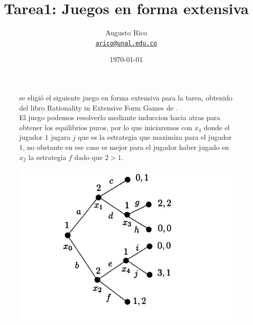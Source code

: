 \documentclass[11pt]{article}
\title{Tarea1: Juegos en forma extensiva
}
\author{Augusto Rico\\
    \href{mailto:arico@unal.edu.co}{\texttt{arico@unal.edu.co}}}
\date{\today}
\begin{document}
\maketitle


\begin{figure}[h]
\begin{minipage}[t]{0.5\textwidth}
    \vspace{0pt}
    \begin{flushleft}
    se eligió el siguiente juego en forma extensiva para la tarea,
    obtenido del libro Rationality in Extensive Form Games de \citet{Perea_2001}.\\
    El juego podemos resolverlo mediante induccion hacia atras para obtener los equilibrios
    puros, por lo que iniciaremos con $x_4$ donde el jugador $1$ jugara $j$ que es la estrategia
    que maximiza para el jugador $1$, no obstante en ese caso es mejor para el jugador haber jugado en $x_2$
    la estrategia $f$ dado que $2>1$.\\
    \end{flushleft}
\end{minipage}
\hfill
\begin{minipage}[t]{0.5\textwidth}

        \vspace{0pt}
        \includegraphics[width=\textwidth]{Screenshot from 2023-05-23 15-21-47.png}
        \label{fig:my_label}
\end{minipage}
\end{figure}
\end{document}
